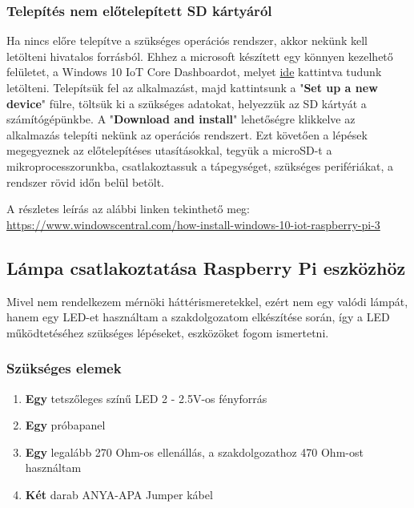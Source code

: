 \documentclass[a4paper,12pt]{report}
\begin{document}
\subsubsection{Telepítés nem előtelepített SD kártyáról}
    Ha nincs előre telepítve a szükséges operációs rendszer, akkor nekünk kell letölteni hivatalos forrásból.
    Ehhez a microsoft készített egy könnyen kezelhető felületet, a Windows 10 IoT Core Dashboardot, melyet
    \href{https://developer.microsoft.com/en-us/windows/iot/Downloads.htm}{ide} kattintva tudunk letölteni.
    Telepítsük fel az alkalmazást, majd kattintsunk a "\textbf{Set up a new device}" fülre, töltsük ki a szükséges adatokat, helyezzük
    az SD kártyát a számítógépünkbe. A "\textbf{Download and install}" lehetőségre klikkelve az alkalmazás telepíti nekünk
    az operációs rendszert.
    Ezt követően a lépések megegyeznek az előtelepítéses utasításokkal, tegyük a microSD-t a mikroprocesszorunkba, csatlakoztassuk
    a tápegységet, szükséges perifériákat, a rendszer rövid időn belül betölt.

    A részletes leírás az alábbi linken tekinthető meg: \url{https://www.windowscentral.com/how-install-windows-10-iot-raspberry-pi-3}

\subsection{Lámpa csatlakoztatása Raspberry Pi eszközhöz}
    Mivel nem rendelkezem mérnöki háttérismeretekkel, ezért nem egy valódi lámpát, hanem egy LED-et használtam a szakdolgozatom
    elkészítése során, így a LED működtetéséhez szükséges lépéseket, eszközöket fogom ismertetni.

\subsubsection{Szükséges elemek}

\begin{enumerate}
    \item \textbf{Egy} tetszőleges színű LED 2 - 2.5V-os fényforrás
    \item \textbf{Egy} próbapanel
    \item \textbf{Egy} legalább 270 Ohm-os ellenállás, a szakdolgozathoz 470 Ohm-ost használtam
    \item \textbf{Két} darab ANYA-APA Jumper kábel
\end{enumerate}
\end{document}
